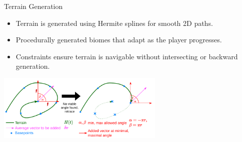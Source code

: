 
\begin{frame}{Terrain Generation}
    \begin{itemize}
        \item Terrain is generated using Hermite splines for smooth 2D paths.
        \item Procedurally generated biomes that adapt as the player progresses.
        \item Constraints ensure terrain is navigable without intersecting or backward generation.
    \end{itemize}
    \centering
    \includegraphics[width=0.6\textwidth]{../figures/Retrace.pdf} %
\end{frame}